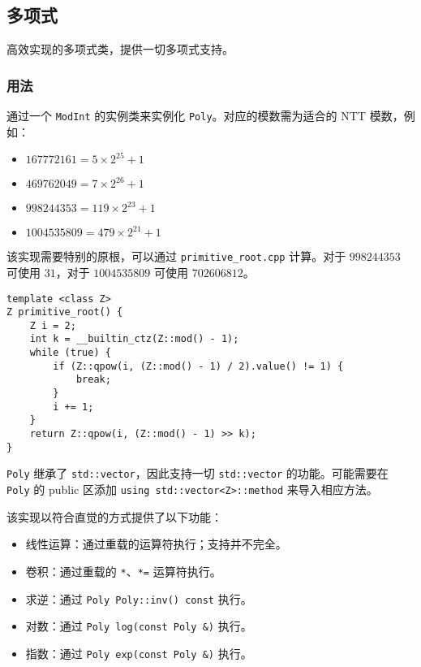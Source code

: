 \subsection{多项式}

高效实现的多项式类，提供一切多项式支持。

\subsubsection{用法}

通过一个 \lstinline{ModInt} 的实例类来实例化 \lstinline{Poly}。对应的模数需为适合的 NTT 模数，例如：

\begin{itemize}
\item $167772161 = 5 \times 2^{25} + 1$
\item $469762049 = 7 \times 2^{26} + 1$
\item $998244353 = 119 \times 2^{23} + 1$
\item $1004535809 = 479 \times 2^{21} + 1$
\end{itemize}

该实现需要特别的原根，可以通过 \lstinline{primitive_root.cpp} 计算。对于 $998244353$ 可使用 $31$，对于 $1004535809$ 可使用 $702606812$。

\begin{lstlisting}
template <class Z>
Z primitive_root() {
    Z i = 2;
    int k = __builtin_ctz(Z::mod() - 1);
    while (true) {
        if (Z::qpow(i, (Z::mod() - 1) / 2).value() != 1) {
            break;
        }
        i += 1;
    }
    return Z::qpow(i, (Z::mod() - 1) >> k);
}
\end{lstlisting}

\lstinline{Poly} 继承了 \lstinline{std::vector}，因此支持一切 \lstinline{std::vector} 的功能。可能需要在 \lstinline{Poly} 的 public 区添加 \lstinline{using std::vector<Z>::method} 来导入相应方法。

该实现以符合直觉的方式提供了以下功能：

\begin{itemize}
\item 线性运算：通过重载的运算符执行；支持并不完全。
\item 卷积：通过重载的 \lstinline{*}、\lstinline{*=} 运算符执行。
\item 求逆：通过 \lstinline{Poly Poly::inv() const} 执行。
\item 对数：通过 \lstinline{Poly log(const Poly &)} 执行。
\item 指数：通过 \lstinline{Poly exp(const Poly &)} 执行。
\end{itemize}

